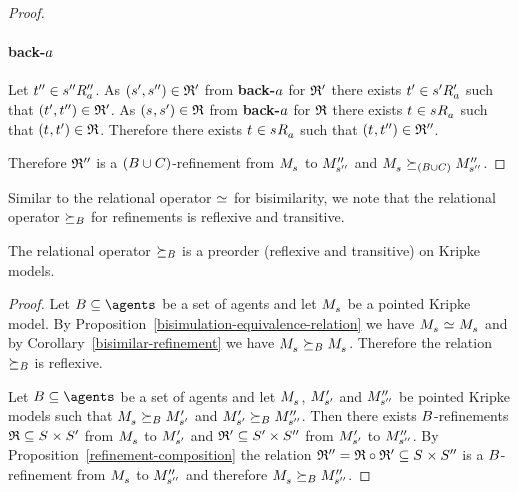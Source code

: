 \begin{proof}
\paragraph{back-$a$}
Let ${t}^{\prime\prime} \in {{s}^{\prime\prime}} {R^{\prime\prime}_{a}}$.
As $({s}^{\prime}, {s}^{\prime\prime}) \in \mathfrak{R}'$ from {\bf back-$a$} for $\mathfrak{R}'$ there exists ${t}^{\prime} \in {{s}^{\prime}} {R^{\prime}_{a}}$ such that $({t}^{\prime}, {t}^{\prime\prime}) \in \mathfrak{R}'$.
As $(\kStateS, \kStateSP) \in \refinement$ from {\bf back-$a$} for $\mathfrak{R}$ there exists $\kStateT \in \kSuccessorsA{\kStateS}$ such that $(\kStateT, \kStateTP) \in \refinement$.
Therefore there exists $\kStateT \in \kSuccessorsA{\kStateS}$ such that $(\kStateT, \kStateTPP) \in \refinement''$.

Therefore $\mathfrak{R}''$ is a $(B \cup C)$-refinement from $\kPModel{\kStateS}$ to ${M^{\prime\prime}_{{s}^{\prime\prime}}}$ and $\kPModel{\kStateS} \simulates[(\agentsB \cup \agentsC)] \kPModelPP{\kStateSPP}$.
\end{proof}

Similar to the relational operator $\bisimilar$ for bisimilarity, we note that the relational operator $\succeq_{B}$ for refinements is reflexive and transitive.

\begin{proposition}\label{refinements-preorder}
The relational operator $\succeq_{B}$ is a preorder (reflexive and transitive) on Kripke models.
\end{proposition}

\begin{proof}
Let $\agentsB \subseteq \agents$ be a set of agents and let $\kPModel{\kStateS}$ be a pointed Kripke model.
By Proposition~\ref{bisimulation-equivalence-relation} we have $\kPModel{\kStateS} \bisimilar \kPModel{\kStateS}$ and by Corollary~\ref{bisimilar-refinement} we have $\kPModel{\kStateS} \simulatesBs \kPModel{\kStateS}$.
Therefore the relation $\succeq_{B}$ is reflexive.

Let $\agentsB \subseteq \agents$ be a set of agents and let $\kPModel{\kStateS}$, ${M^{\prime}_{{s}^{\prime}}}$ and ${M^{\prime\prime}_{{s}^{\prime\prime}}}$ be pointed Kripke models such that $\kPModel{\kStateS} \simulatesBs \kPModelP{\kStateSP}$ and ${M^{\prime}_{{s}^{\prime}}} \succeq_{B} {M^{\prime\prime}_{{s}^{\prime\prime}}}$.
Then there exists $B$-refinements $\refinement \subseteq \kStates \times \kStatesP$ from $\kPModel{\kStateS}$ to ${M^{\prime}_{{s}^{\prime}}}$ and $\mathfrak{R}' \subseteq {S^{\prime}} \times {S^{\prime\prime}}$ from ${M^{\prime}_{{s}^{\prime}}}$ to ${M^{\prime\prime}_{{s}^{\prime\prime}}}$.
By Proposition~\ref{refinement-composition} the relation $\refinement'' = \refinement \circ \refinement' \subseteq \kStates \times \kStatesPP$ is a $B$-refinement from $\kPModel{\kStateS}$ to ${M^{\prime\prime}_{{s}^{\prime\prime}}}$ and therefore $\kPModel{\kStateS} \simulatesBs \kPModelPP{\kStateSPP}$.
\end{proof}


